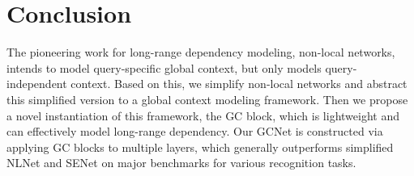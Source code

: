 \documentclass[10pt,twocolumn,letterpaper]{article}
\begin{document}
\section{Conclusion}
The pioneering work for long-range dependency modeling, non-local networks, intends to model query-specific global context, but only models query-independent context. Based on this, we simplify non-local networks and abstract this simplified version to a global context modeling framework. Then we propose a novel instantiation of this framework, the GC block, which is lightweight and can effectively model long-range dependency.
Our GCNet is constructed via applying GC blocks to multiple layers, which generally outperforms simplified NLNet and SENet on major benchmarks for various recognition tasks.

{


}
\end{document}
